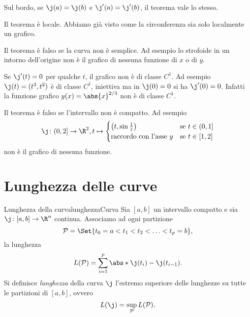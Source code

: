 \begin{oss}
	Sul bordo, se \(\j(a)=\j(b)\) e \(\j'(a)=\j'(b)\), il teorema vale lo stesso.
\end{oss}

\begin{oss}
	Il teorema è locale. Abbiamo già visto come la circonferenza sia solo localmente un grafico.
\end{oss}

\begin{oss}
	Il teorema è falso se la curva non è semplice.
	Ad esempio lo strofoide in un intorno dell'origine non è il grafico di nessuna funzione di \(x\) o di \(y\).
\end{oss}

\begin{oss}
	Se \(\j'(t)=0\) per qualche \(t\), il grafico non è di classe \(C^1\).
	Ad esempio \(\j(t) = (t^3,t^2)\) è di classe \(C^1\), iniettiva ma in \(\j(0)=0\) si ha \(\j'(0)=0\).
	Infatti la funzione grafico \(y(x)=\abs{x}^{2/3}\) non è di classe \(C^1\).
\end{oss}

\begin{oss}
	Il teorema è falso se l'intervallo non è compatto.
	Ad esempio
	\[
		\j\colon (0,2] \to \R^2, t\mapsto 	\begin{cases}
			\left(t,\sin \frac{1}{t}\right)  & \text{se }t\in (0,1] \\
			\text{raccordo con l'asse \(y\)} & \text{se }t\in [1,2]
		\end{cases}
	\]
	non è il grafico di nessuna funzione.
\end{oss}
\section{Lunghezza delle curve}

\begin{defn}{Lunghezza della curva}{lunghezzaCurva}
	Sia \([a,b]\) un intervallo compatto e sia \(\j\colon [a,b]\to \R^n\) continua.
	Associamo ad ogni partizione
	\[
		\mathcal{P} = \Set{t_0 = a < t_1 < t_2 < \ldots < t_p = b},
	\]
	la lunghezza
	\[
		L(\mathcal{P}) = \sum_{i=1}^p \abs*{\j(t_i)-\j(t_{i-1})}.
	\]
	Si definisce \emph{lunghezza} della curva \(\j\) l'estremo superiore delle lunghezze su tutte le partizioni di \([a,b]\), ovvero
	\[
		L(\j) = \sup_\mathcal{P} L(\mathcal{P}).
	\]
\end{defn}

